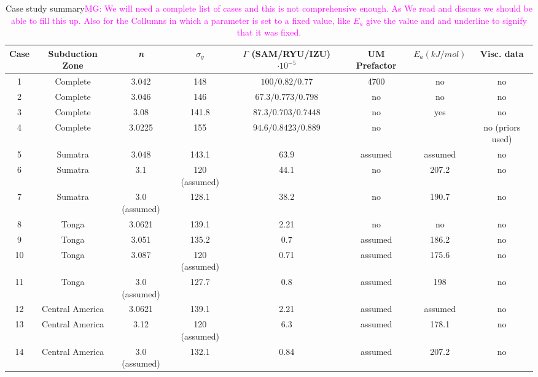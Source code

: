 \documentclass[12pt]{article}
\newcommand{\mgnote}[1]{\textcolor{magenta}{MG: #1}}
\begin{document}
\begin{table}

\centering

	\begin{table}[H]
		\caption{Case study summary\mgnote{We will need a complete list of cases and this is not comprehensive enough. As We read and discuss we should be able to fill this up. Also for the Collumns in which a parameter is set to a fixed value, like $E_a$ give the value and and underline to signify that it was fixed.}} %
		\centering  %
		\begin{tabular}{c c c c c c c c  } %
		\hline \hline                        %
		Case & Subduction Zone & \textit{n} &$\sigma_y$&$\Gamma$ (SAM/RYU/IZU) $\cdot 10^{-5}$ &UM Prefactor &$E_a (kJ/mol)$&Visc. data   \\ [0.5ex] %
		\hline                  %
	      	 1 &Complete& 3.042 & 148 & $100/0.82/0.77$ &  4700& no & no  \\
	        2 &Complete& 3.046 & 146 & $67.3/0.773/0.798$ & no & no & no \\
	        3 &Complete& 3.08 & 141.8 & $87.3/0.703/0.7448$ & no & yes & no \\
	        4 &Complete& 3.0225 & 155 & $94.6/0.8423/0.889$ & no & & no (priors used) \\
                5 &Sumatra& 3.048 & 143.1 & $63.9$ &  assumed& assumed& no \\

                 6 &Sumatra& 3.1 & 120 (assumed) & 44.1 & no & 207.2   &no\\
                  7 &Sumatra& 3.0 (assumed) & 128.1 & 38.2 & no & 190.7   &no\\
              8 &Tonga  & 3.0621 & 139.1 & 2.21& no & no &no  \\              
               9 &Tonga  & 3.051 & 135.2 & 0.7& assumed & 186.2 &no  \\             
              10 &Tonga  & 3.087 &  120 (assumed) & 0.71 &assumed &175.6  &no  \\              
               11 &Tonga  & 3.0 (assumed) & 127.7 & 0.8 &assumed &198  &no  \\             
               12 &Central America  & 3.0621 & 139.1 & 2.21& assumed & assumed &no  \\             
                 13 &Central America  & 3.12 & 120 (assumed) & 6.3& assumed & 178.1 &no  \\         
                 14 &Central America  & 3.0 (assumed) & 132.1 & 0.84& assumed& 207.2 &no  \\        
          
          
                \hline %
		\end{tabular}
		\label{table:inversions} %
		\end{table}
\end{table}
\end{document}
